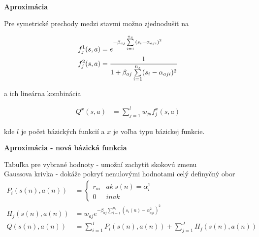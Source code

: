 \documentclass[xcolor=dvipsnames]{beamer}
\begin{document}
\begin{frame}{\bf Aproximácia}

Pre symetrické prechody medzi stavmi možno zjednodušiť na

\begin{align*}
f_j^1(\boldmath{s, a}) &= e^{ -\beta_{aj} \sum\limits_{i=1}^{n_s}{(s_i - \alpha_{aji})^2} }  \\
f_j^2(\boldmath{s, a}) &= \frac{1}{1 + {\beta_{aj} \sum\limits_{i=1}^{n_s}(s_i - \alpha_{aji})^2}}  \\
\end{align*}

a ich lineárna kombinácia

\begin{align}
    Q^x(s, a)&= \sum\limits_{j=1}^{l}w_{j a}f^x_{j}(s, a) \nonumber
\end{align}

kde $l$ je počet bázických funkcií a $x$ je voľba typu bázickej funkcie.



\end{frame}


\begin{frame}{\bf Aproximácia - nová bázická funkcia}

Tabuľka pre vybrané hodnoty - umožní zachytit skokovú zmenu \\
Gaussova krivka - dokáže pokryť nenulovými hodnotami celý definyčný obor \\

\begin{align}
P_i(s(n), a(n)) &=
\left\{
	\begin{array}{ll}
		r_{ai}  & ak \ s(n) = \alpha^1_i \\
		0 & inak
	\end{array}
\right. \\
  H_j(s(n), a(n)) &= w_{aj} e^{ -\beta_{aj} \sum\limits_{i=1}^{n_s}{(s_i(n) - \alpha^2_{aji})^2 }} \\
  Q(s(n), a(n)) &= \sum\limits_{i=1}^{I} P_i(s(n),a(n)) + \sum\limits_{j=1}^{J} H_j(s(n), a(n))
  \label{eq:peak_hill}
\end{align}


\end{frame}
\end{document}
